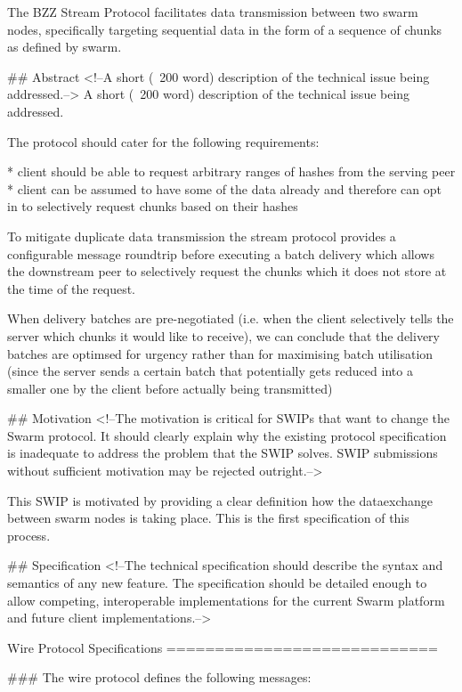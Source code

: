 
The BZZ Stream Protocol facilitates data transmission between two swarm nodes, specifically targeting sequential data in the form of a sequence of chunks as defined by swarm.

## Abstract
<!--A short (~200 word) description of the technical issue being addressed.-->
A short (~200 word) description of the technical issue being addressed.

The protocol should cater for the following requirements:

 * client should be able to request arbitrary ranges of hashes from the serving peer
 * client can be assumed to have some of the data already and therefore can opt in to selectively request chunks based on their hashes

To mitigate duplicate data transmission the stream protocol provides a configurable message roundtrip before executing a batch delivery which allows the downstream peer to selectively request the chunks which it does not store at the time of the request. 

When delivery batches are pre-negotiated (i.e. when the client selectively tells the server which chunks it would like to receive), we can conclude that the delivery batches are optimsed for urgency rather than for maximising batch utilisation (since the server sends a certain batch that potentially gets reduced into a smaller one by the client before actually being transmitted)

## Motivation
<!--The motivation is critical for SWIPs that want to change the Swarm protocol. It should clearly explain why the existing protocol specification is inadequate to address the problem that the SWIP solves. SWIP submissions without sufficient motivation may be rejected outright.-->

This SWIP is motivated by providing a clear definition how the dataexchange between swarm nodes is taking place. This is the first specification of this process.

## Specification
<!--The technical specification should describe the syntax and semantics of any new feature. The specification should be detailed enough to allow competing, interoperable implementations for the current Swarm platform and future client implementations.-->

Wire Protocol Specifications
============================

### The wire protocol defines the following messages:


